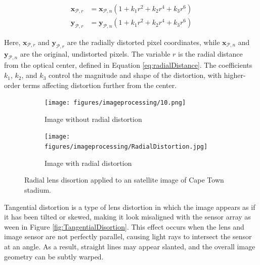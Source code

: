 \begin{equation}
    \begin{split}
    \mathbf{x}_{\mathcal{P},r}  &= \mathbf{x}_{\mathcal{P},n}(1 + k_1r^2 + k_2r^4 + k_3r^6) \\
    \mathbf{y}_{\mathcal{P},r}  &= \mathbf{y}_{\mathcal{P},n} (1+ k_1r^2 + k_2r^4 + k_3r^6)
    \end{split}
\end{equation}

\noindent
Here, $\mathbf{x}_{\mathcal{P},r}$ and $\mathbf{y}_{\mathcal{P},r}$ are the radially distorted pixel coordinates, while $\mathbf{x}_{\mathcal{P},n}$ and $\mathbf{y}_{\mathcal{P},n}$ are the original, undistorted pixels. 
The variable $r$ is the radial distance from the optical center, defined in Equation \ref{eq:radialDistance}. 
The coefficients $k_1$, $k_2$, and $k_3$ control the magnitude and shape of the distortion, with higher-order terms affecting distortion further from the center.

\begin{figure}[H]
    \centering
    \begin{subfigure}[b]{0.48\linewidth}
        \centering
        \texttt{[image: figures/imageprocessing/10.png]}
        \caption{Image without radial distortion}
        \label{fig:RD1}
    \end{subfigure}
    \hfill
    \begin{subfigure}[b]{0.48\linewidth}
        \centering
        \texttt{[image: figures/imageprocessing/RadialDistortion.jpg]}
        \caption{Image with radial distortion}
        \label{fig:Radial2}
    \end{subfigure}
    \caption{Radial lens disortion applied to an satellite image of Cape Town stadium.}
    \label{fig:RadialDisortion}
\end{figure}


Tangential distortion is a type of lens distortion in which the image appears as if it has been tilted or skewed, making it look misaligned with the 
sensor array as ween in Figure \ref{fig:TangentialDisortion}. This effect occurs when the lens and image sensor are not perfectly parallel, causing light rays to intersect the sensor at an angle. As a 
result, straight lines may appear slanted, and the overall image geometry can be subtly warped.

